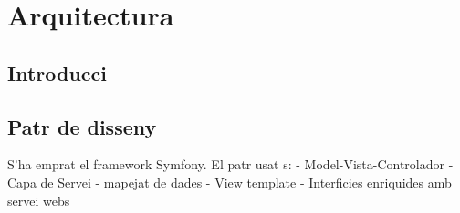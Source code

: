 \chapter{Arquitectura}
\label{cha:arquitechture}

\section{Introducci}

\section{Patr de disseny}
S'ha emprat el framework Symfony. El patr usat s:
- Model-Vista-Controlador 
- Capa de Servei 
- mapejat de dades
- View template
- Interficies enriquides amb servei webs



